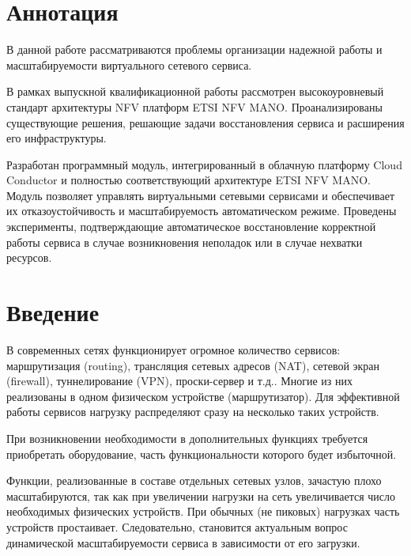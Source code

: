 \documentclass[oneside,final,14pt,a4paper]{extreport}
\begin{document}
\chapter*{Аннотация}
В данной работе рассматриваются проблемы организации надежной работы и масштабируемости виртуального сетевого сервиса.

В рамках выпускной квалификационной работы рассмотрен высокоуровневый стандарт архитектуры NFV платформ ETSI NFV MANO. Проанализированы существующие решения, решающие задачи восстановления сервиса и расширения его инфраструктуры.

Разработан программный модуль, интегрированный в облачную платформу Cloud Conductor и полностью соответствующий архитектуре ETSI NFV MANO. Модуль позволяет управлять виртуальными сетевыми сервисами и обеспечивает их отказоустойчивость и масштабируемость автоматическом режиме. Проведены эксперименты, подтверждающие автоматическое восстановление корректной работы сервиса в случае возникновения неполадок или в случае нехватки ресурсов.





\tableofcontents %





\chapter*{Введение}

В современных сетях функционирует огромное количество сервисов: маршрутизация (routing), трансляция сетевых адресов (NAT), сетевой экран (firewall), туннелирование (VPN), проски-сервер и т.д.. Многие из них реализованы в одном физическом устройстве (маршрутизатор). Для эффективной работы сервисов нагрузку распределяют сразу на несколько таких устройств. 

При возникновении необходимости в дополнительных функциях требуется приобретать оборудование, часть функциональности которого будет избыточной. 

Функции, реализованные в составе отдельных сетевых узлов, зачастую плохо масштабируются, так как при увеличении нагрузки на сеть увеличивается число необходимых физических устройств. При обычных (не пиковых) нагрузках часть устройств простаивает. Следовательно, становится актуальным вопрос динамической масштабируемости сервиса в зависимости от его загрузки.
\end{document}
